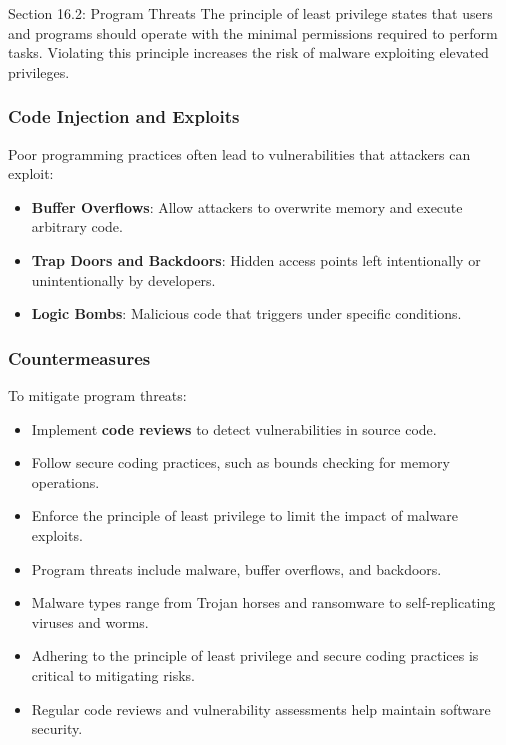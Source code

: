 \begin{notes}{Section 16.2: Program Threats}
    The principle of least privilege states that users and programs should operate with the minimal permissions required to perform tasks. Violating this principle increases the risk of malware exploiting 
    elevated privileges.
    
    \subsubsection*{Code Injection and Exploits}
    
    Poor programming practices often lead to vulnerabilities that attackers can exploit:
    \begin{itemize}
        \item \textbf{Buffer Overflows}: Allow attackers to overwrite memory and execute arbitrary code.
        \item \textbf{Trap Doors and Backdoors}: Hidden access points left intentionally or unintentionally by developers.
        \item \textbf{Logic Bombs}: Malicious code that triggers under specific conditions.
    \end{itemize}
    
    \subsubsection*{Countermeasures}
    
    To mitigate program threats:
    \begin{itemize}
        \item Implement \textbf{code reviews} to detect vulnerabilities in source code.
        \item Follow secure coding practices, such as bounds checking for memory operations.
        \item Enforce the principle of least privilege to limit the impact of malware exploits.
    \end{itemize}
    
    \begin{highlight}
        \begin{itemize}
            \item Program threats include malware, buffer overflows, and backdoors.
            \item Malware types range from Trojan horses and ransomware to self-replicating viruses and worms.
            \item Adhering to the principle of least privilege and secure coding practices is critical to mitigating risks.
            \item Regular code reviews and vulnerability assessments help maintain software security.
        \end{itemize}
    \end{highlight}
\end{notes}

